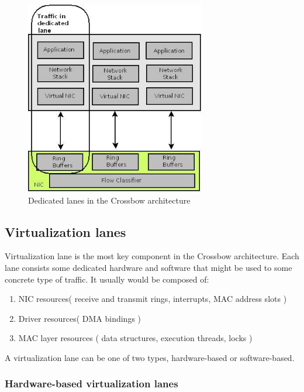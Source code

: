 \documentclass[11pt]{book}
\begin{document}
      
                 \begin{figure}[H]
                        \begin{center}
                              \includegraphics[width=0.7\textwidth]{img/crossbow-traffic-dedicated-line.jpeg}
                              \caption{Dedicated lanes in the Crossbow architecture}
                        \end{center}
                 \end{figure}
		
		\subsection{Virtualization lanes}

                        Virtualization lane is the most key component in the Crossbow architecture. Each lane consists some dedicated hardware and software that might be 
			used to some concrete type of traffic. It usually would be composed of: 
			\begin{enumerate}
				\item{NIC resources( receive and transmit rings, interrupts, MAC address slots )}
				\item{Driver resources( DMA bindings )}
				\item{MAC layer resources ( data structures, execution threads, locks )}
			\end{enumerate}
			
			A virtualization lane can be one of two types, hardware-based or software-based.
			
			\subsubsection{Hardware-based virtualization lanes}
			
\end{document}
